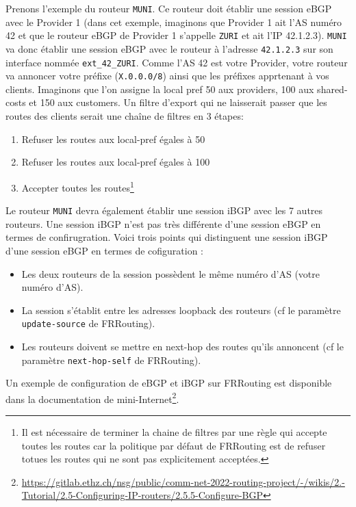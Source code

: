 \documentclass[a4paper, 11pt]{article}
\begin{document}
Prenons l'exemple du routeur \texttt{MUNI}. Ce routeur doit
établir une session eBGP avec le Provider 1 (dans cet exemple,
imaginons que Provider 1 ait l'AS numéro 42 et que le routeur eBGP
de Provider 1 s'appelle \texttt{ZURI} et ait l'IP 42.1.2.3).
\texttt{MUNI} va donc établir une session eBGP avec le routeur
à l'adresse \texttt{42.1.2.3} sur son interface nommée
\texttt{ext\_42\_ZURI}. Comme l'AS 42 est votre Provider, votre
routeur va annoncer votre préfixe (\texttt{X.0.0.0/8}) ainsi que
les préfixes apprtenant à vos clients. 
Imaginons que l'on assigne la local pref 50 aux providers, 100 aux
shared-costs et 150 aux customers. Un filtre d'export qui ne laisserait
passer que les routes des clients serait une chaîne de filtres en 3
étapes:
\begin{enumerate}
    \item Refuser les routes aux local-pref égales à 50
    \item Refuser les routes aux local-pref égales à 100
    \item Accepter toutes les routes\footnote{Il est nécessaire
    de terminer la chaine de filtres par une règle qui accepte
    toutes les routes car la politique par défaut de FRRouting est
    de refuser totues les routes qui ne sont pas explicitement
    acceptées.}
\end{enumerate}

Le routeur \texttt{MUNI} devra également établir une session iBGP
avec les 7 autres routeurs. Une session iBGP n'est pas très différente
d'une session eBGP en termes de confirugration. Voici trois points
qui distinguent une session iBGP d'une session eBGP en termes de cofiguration :

\begin{itemize}
    \item Les deux routeurs de la session possèdent le même numéro d'AS
          (votre numéro d'AS).
    \item La session s'établit entre les adresses loopback des routeurs
          (cf le paramètre \texttt{update-source} de FRRouting).
    \item Les routeurs doivent se mettre en next-hop des routes qu'ils
          annoncent (cf le paramètre \texttt{next-hop-self} de FRRouting).
\end{itemize}

Un exemple de configuration de eBGP et iBGP sur FRRouting
est disponible dans la documentation de
mini-Internet\footnote{\url{https://gitlab.ethz.ch/nsg/public/comm-net-2022-routing-project/-/wikis/2.-Tutorial/2.5-Configuring-IP-routers/2.5.5-Configure-BGP}}.
\end{document}
